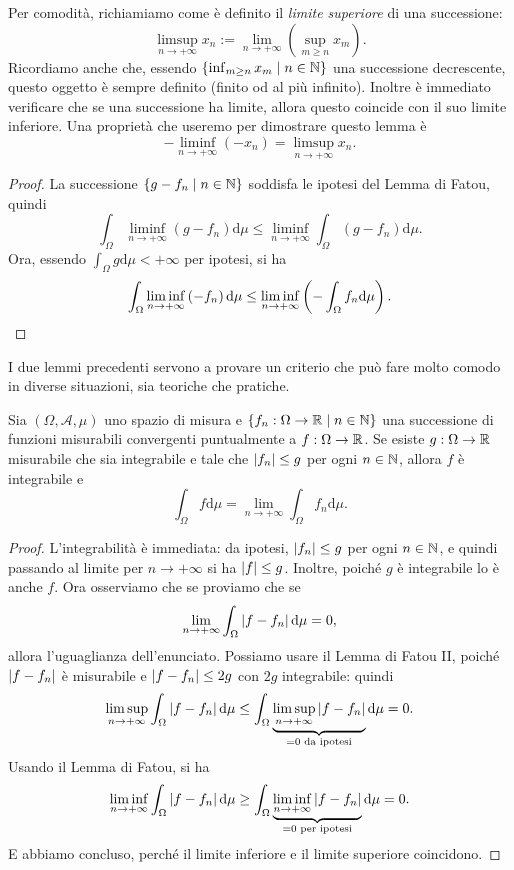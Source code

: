 Per comodità, richiamiamo come è definito il {\em limite superiore} di una successione:
\[\limsup_{n \to +\infty} x_n := \lim_{n \to +\infty} \left(\sup_{m \ge n} x_m\right) .\]
Ricordiamo anche che, essendo \(\left\{\inf_{m \ge n} x_m \mid n \in \mathbb N\right\}\) una successione decrescente, questo oggetto è sempre definito (finito od al più infinito). Inoltre è immediato verificare che se una successione ha limite, allora questo coincide con il suo limite inferiore. Una proprietà che useremo per dimostrare questo lemma è
\[- \liminf_{n \to +\infty}\left( -x_n\right) = \limsup_{n \to +\infty} x_n . \]

\begin{proof}
La successione \(\left\{g-f_n \mid n \in \mathbb N\right\}\) soddisfa le ipotesi del Lemma di Fatou, quindi
\[\int_\Omega \liminf_{n \to +\infty}\left( g-f_n \right) \mathrm d \mu \le \liminf_{n \to +\infty} \int_\Omega \left( g-f_n \right) \mathrm d \mu .\]
Ora, essendo \(\int_\Omega g \mathrm d \mu < +\infty\) per ipotesi, si ha
\[\int_\Omega \liminf_{n \to +\infty}\left( -f_n \right) \mathrm d \mu \le \liminf_{n \to +\infty}  \left(- \int_\Omega f_n \mathrm d \mu \right) . \qedhere\]
\end{proof}

I due lemmi precedenti servono a provare un criterio che può fare molto comodo in diverse situazioni, sia teoriche che pratiche.

\begin{proposizione}
Sia \((\Omega, \mathcal A, \mu)\) uno spazio di misura e \(\left\{f_n : \Omega \to \mathbb R \mid n \in \mathbb N\right\}\) una successione di funzioni misurabili convergenti puntualmente a \(f : \Omega \to \mathbb R\). Se esiste \(g : \Omega \to \mathbb R\) misurabile che sia integrabile e tale che \(\left\lvert f_n\right\rvert \le g\) per ogni \(n \in \mathbb N\), allora \(f\) è integrabile e
\[\int_\Omega f \mathrm d \mu = \lim_{n \to +\infty} \int_\Omega f_n \mathrm d \mu .\]
\end{proposizione}

\begin{proof}
L'integrabilità è immediata: da ipotesi, \(\left\lvert f_n\right\rvert \le g\) per ogni \(n \in \mathbb N\), e quindi passando al limite per \(n \to +\infty\) si ha \(\left\lvert f\right\rvert \le g\). Inoltre, poiché \(g\) è integrabile lo è anche \(f\). Ora osserviamo che se proviamo che se
\[\lim_{n \to +\infty} \int_{\Omega} \left\lvert f-f_n\right\rvert \mathrm d \mu = 0 ,\]
allora l'uguaglianza dell'enunciato. Possiamo usare il Lemma di Fatou II, poiché \(\left\lvert f-f_n\right\rvert\) è misurabile e \(\left\lvert f-f_n\right\rvert \le 2g\) con \(2g\) integrabile: quindi
\[\limsup_{n \to +\infty} \int_\Omega \left\lvert f-f_n\right\rvert \mathrm d \mu \le \int_\Omega \underbrace{\limsup_{n \to +\infty} \left\lvert f-f_n\right\rvert}_{= 0 \text{ da ipotesi}} \mathrm d \mu = 0 .\]
Usando il Lemma di Fatou, si ha
\[\liminf_{n \to +\infty} \int_\Omega \left\lvert f-f_n\right\rvert \mathrm d \mu \ge \int_\Omega \underbrace{\liminf_{n \to +\infty} \left\lvert f-f_n\right\rvert}_{= 0 \text{ per ipotesi}} \mathrm d \mu = 0 . \] E abbiamo concluso, perché il limite inferiore e il limite superiore coincidono.
\end{proof}
